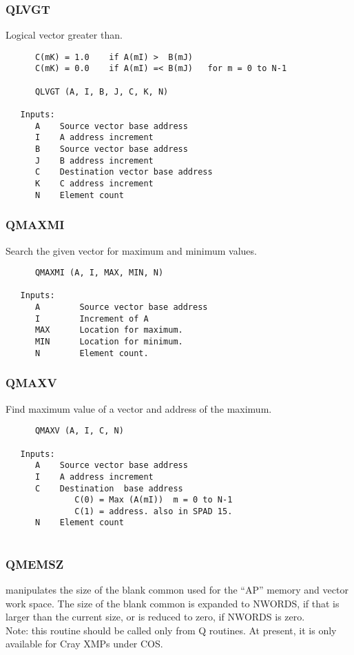 \subsubsection{QLVGT }
Logical vector greater than.

\begin{verbatim}
      C(mK) = 1.0    if A(mI) >  B(mJ)
      C(mK) = 0.0    if A(mI) =< B(mJ)   for m = 0 to N-1

      QLVGT (A, I, B, J, C, K, N)

   Inputs:
      A    Source vector base address
      I    A address increment
      B    Source vector base address
      J    B address increment
      C    Destination vector base address
      K    C address increment
      N    Element count

\end{verbatim}
\subsubsection{QMAXMI }
Search the given vector for maximum and minimum values.

\begin{verbatim}
      QMAXMI (A, I, MAX, MIN, N)

   Inputs:
      A        Source vector base address
      I        Increment of A
      MAX      Location for maximum.
      MIN      Location for minimum.
      N        Element count.

\end{verbatim}
\subsubsection{QMAXV }
Find maximum value of a vector and address of the maximum.

\begin{verbatim}
      QMAXV (A, I, C, N)

   Inputs:
      A    Source vector base address
      I    A address increment
      C    Destination  base address
              C(0) = Max (A(mI))  m = 0 to N-1
              C(1) = address. also in SPAD 15.
      N    Element count
 

\end{verbatim}
\subsubsection{QMEMSZ }
manipulates the size of the blank common used for the ``AP'' memory and
vector work space.  The size of the blank common is expanded to
NWORDS, if that is larger than the current size, or is reduced to
zero, if NWORDS is zero.\\
Note: this routine should be called only from Q routines. At present,
it is only available for Cray XMPs under COS.

